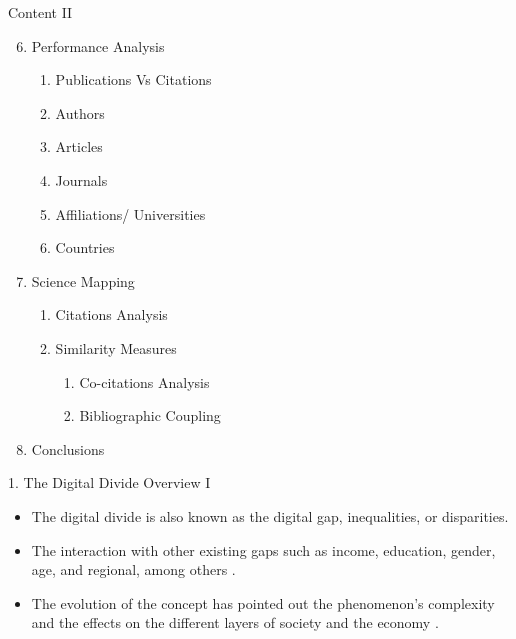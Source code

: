 \documentclass[
  ignorenonframetext,
]{beamer}
\providecommand{\tightlist}{%
  \setlength{\itemsep}{0pt}\setlength{\parskip}{0pt}}
\begin{document}
\begin{frame}{Content II}
\protect\hypertarget{content-ii}{}
\begin{enumerate}
\setcounter{enumi}{5}
\item
  Performance Analysis

  \begin{enumerate}
  \tightlist
  \item
    Publications Vs Citations
  \item
    Authors
  \item
    Articles
  \item
    Journals
  \item
    Affiliations/ Universities
  \item
    Countries
  \end{enumerate}
\item
  Science Mapping

  \begin{enumerate}
  \tightlist
  \item
    Citations Analysis
  \item
    Similarity Measures

    \begin{enumerate}
    \tightlist
    \item
      Co-citations Analysis
    \item
      Bibliographic Coupling
    \end{enumerate}
  \end{enumerate}
\item
  Conclusions
\end{enumerate}
\end{frame}

\begin{frame}{1. The Digital Divide Overview I}
\protect\hypertarget{the-digital-divide-overview-i}{}
\begin{itemize}
\tightlist
\item
  The digital divide is also known as the digital gap, inequalities, or
  disparities.
\item
  The interaction with other existing gaps such as income, education,
  gender, age, and regional, among others \citep{ragnedda2017}.
\item
  The evolution of the concept has pointed out the phenomenon's
  complexity and the effects on the different layers of society and the
  economy \citep{vandijk2003, ragnedda2017, shakina2021}.
\end{itemize}
\end{frame}
\end{document}
